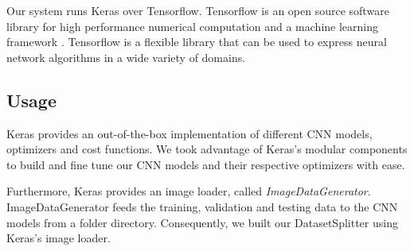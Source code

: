 Our system runs Keras over Tensorflow. Tensorflow is an open source software library for high performance numerical computation and a machine learning framework \cite{tensorflow2015-whitepaper}. Tensorflow is a flexible library that can be used to express neural network algorithms in a wide variety of domains.

\subsection{Usage}
Keras provides an out-of-the-box implementation of different CNN models, optimizers and cost functions. We took advantage of Keras's modular components to build and fine tune our CNN models and their respective optimizers with ease.

Furthermore, Keras provides an image loader, called \textit{ImageDataGenerator}. ImageDataGenerator feeds the training, validation and testing data to the CNN models from a folder directory. Consequently, we built our DatasetSplitter using Keras's image loader.
